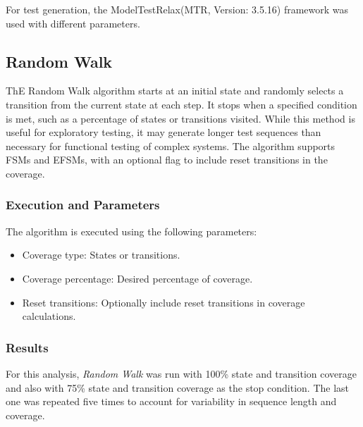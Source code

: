 \documentclass[main.tex]{subfiles}
\begin{document}
For test generation, the ModelTestRelax(MTR,  Version: 3.5.16) framework \cite{mtr} was used with different parameters.

\subsection{Random Walk}
ThE Random Walk algorithm starts at an initial state and randomly selects a transition from the current state at each step. It stops when a specified condition is met, such as a percentage of states or transitions visited. While this method is useful for exploratory testing, it may generate longer test sequences than necessary for functional testing of complex systems. The algorithm supports FSMs and EFSMs, with an optional flag to include reset transitions in the coverage.

\subsubsection{Execution and Parameters}
The algorithm is executed using the following parameters:
\begin{itemize}
    \item Coverage type: States or transitions.
    \item Coverage percentage: Desired percentage of coverage.
    \item Reset transitions: Optionally include reset transitions in coverage calculations.
\end{itemize}

\subsubsection{Results}
For this analysis, \textit{Random Walk} was run with 100\% state and transition coverage and also with 75\% state and transition coverage as the stop condition. The last one was repeated five times to account for variability in sequence length and coverage.
\end{document}
